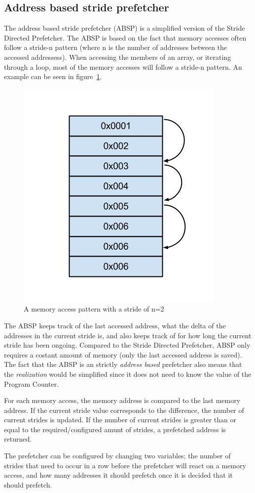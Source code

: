 \subsection{Address based stride prefetcher}
\label{sec:stridePrefetcher}
The address based stride prefetcher (ABSP) is a simplified version of
the Stride Directed Prefetcher. The ABSP is based on the fact that
memory accesses often follow a stride-n pattern (where n is the number
of addresses between the accessed addressess). When accessing the
members of an array, or iterating through a loop, most of the memory
accesses will follow a stride-n pattern. An example can be seen in
figure~\ref{fig:stride}.

\begin{figure}[H]
\centerline{\includegraphics[scale=0.5]{./figures/stride}}
\caption{A memory access pattern with a stride of n=2}
\label{fig:stride}
\end{figure}

The ABSP keeps track of the last accessed address, what the delta of the addresses in the current stride is, and
also keeps track of for how long the current stride has been
ongoing. Compared to the Stride Directed Prefetcher, ABSP only requires a costant amount of memory (only the last accessed address is saved). The fact that the ABSP is an strictly \emph{address based} prefetcher also means that the \emph{realization} would be simplified since it does not need to know the value of the Program Counter.

For each memory access, the memory address is compared to the last
memory address. If the current stride value corresponds to the
difference, the number of current strides is updated. If the number of
current strides is greater than or equal to the required/configured
amunt of strides, a prefetched address is returned.  

The prefetcher can be configured by changing two variables;
the number of strides that need to occur in a row before
the prefetcher will react on a memory access, and how many addresses it should prefetch once it is decided that it should prefetch.

